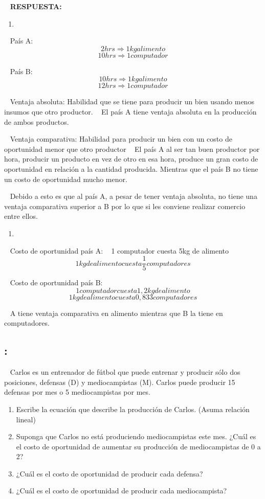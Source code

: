 \documentclass[
  letterpaper,
  DIV=11,
  numbers=noendperiod]{scrreport}
\providecommand{\tightlist}{%
  \setlength{\itemsep}{0pt}\setlength{\parskip}{0pt}}\usepackage{longtable,booktabs,array}
\begin{document}
~ \textbf{RESPUESTA:}

\begin{enumerate}
\def\labelenumi{\alph{enumi})}
\tightlist
\item
\end{enumerate}

~ País A: \[2 hrs \Rightarrow 1 kg alimento\]
\[10 hrs \Rightarrow 1 computador\]

~ País B: \[10 hrs \Rightarrow 1 kg alimento\]
\[12 hrs \Rightarrow 1 computador\]

~ Ventaja absoluta: Habilidad que se tiene para producir un bien usando
menos insumos que otro productor. ~ El país A tiene ventaja absoluta en
la producción de ambos productos.

~ Ventaja comparativa: Habilidad para producir un bien con un costo de
oportunidad menor que otro productor ~ El país A al ser tan buen
productor por hora, producir un producto en vez de otro en esa hora,
produce un gran costo de oportunidad en relación a la cantidad
producida. Mientras que el país B no tiene un costo de oportunidad mucho
menor.

~ Debido a esto es que al país A, a pesar de tener ventaja absoluta, no
tiene una ventaja comparativa superior a B por lo que si les conviene
realizar comercio entre ellos.

\begin{enumerate}
\def\labelenumi{\alph{enumi})}
\setcounter{enumi}{1}
\tightlist
\item
\end{enumerate}

~ Costo de oportunidad país A: ~ 1 computador cuesta 5kg de alimento
\[1 kg de alimento cuesta \frac{1}{5} computadores\]

~ Costo de oportunidad país B:
\[1 computador cuesta 1,2 kg de alimento\]
\[1 kg de alimento cuesta 0,833 computadores\]

~ A tiene ventaja comparativa en alimento mientras que B la tiene en
computadores.

\hypertarget{section-4}{%
\subsection{:}\label{section-4}}

~ Carlos es un entrenador de fútbol que puede entrenar y producir sólo
dos posiciones, defensas (D) y mediocampistas (M). Carlos puede producir
15 defensas por mes o 5 mediocampistas por mes.

\begin{enumerate}
\def\labelenumi{\alph{enumi})}
\item
  Escribe la ecuación que describe la producción de Carlos. (Asuma
  relación lineal)
\item
  Suponga que Carlos no está produciendo mediocampistas este mes. ¿Cuál
  es el costo de oportunidad de aumentar su producción de mediocampistas
  de 0 a 2?
\item
  ¿Cuál es el costo de oportunidad de producir cada defensa?
\item
  ¿Cuál es el costo de oportunidad de producir cada mediocampista?
\end{enumerate}
\end{document}
